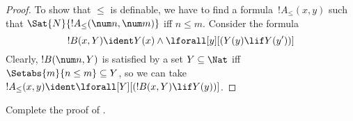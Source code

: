 \documentclass[../../../include/open-logic-section]{subfiles}
\begin{document}
\begin{proof}
To show that $\le$ is definable, we have to find a formula~$!A_\le(x, y)$
such that $\Sat{N}{!A_\le(\num n, \num m)}$ iff $n \le m$. Consider the formula
\[
!B(x, Y) \ident Y(x) \land \lforall[y][(Y(y) \lif Y(y'))]
\]
Clearly, $!B(\num n, Y)$ is satisfied by a set $Y \subseteq \Nat$ iff
$\Setabs{m}{n \le m} \subseteq Y$, so we can take $!A_\le(x, y) \ident
\lforall[Y][(!B(x, Y) \lif Y(y))]$.
\end{proof}

\begin{prob}
Complete the proof of .
\end{prob}
\end{document}
